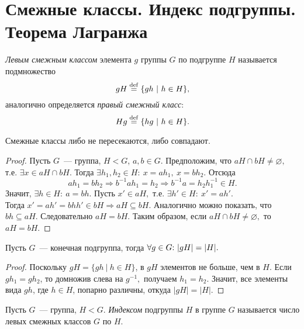 \newpage
	\section{Смежные классы. Индекс подгруппы. Теорема Лагранжа}
	\setcounter{definition}{0}
	\begin{definition}
		\textit{Левым смежным классом} элемента $g$ группы $G$ по подгруппе $H$ называется подмножество
		\begin{equation*}
			gH \deq \{gh \ | \ h \in H\},
		\end{equation*}
		аналогично определяется \textit{правый смежный класс}:
		\begin{equation*}
			Hg \stackrel{\mathrm{def}}{=} \{hg \ | \ h \in H\}.
		\end{equation*}
	\end{definition}
        \begin{lemma}
            Смежные классы либо не пересекаются, либо совпадают.
        \end{lemma}
        \begin{proof}
        Пусть $G$~--- группа, ${H < G}$, ${a,b \in G.}$ Предположим, что ${aH \cap bH \neq \varnothing,}$ т.е. ${\exists x \in aH \cap bH.}$ Тогда ${\exists h_1, h_2 \in H{:} \ x = ah_1, \ x = bh_2.}$  Отсюда 
        \begin{equation*}
            ah_1 = bh_2 \Rightarrow b^{-1}ah_1 = h_2 \Rightarrow b^{-1}a = h_2h_1^{-1} \in H.
        \end{equation*}
        Значит, ${\exists h \in H{:} \ a = bh.}$ Пусть ${x' \in aH,}$ т.е. ${\exists h' \in H{:} \ x' = ah'.}$ \\
        Тогда ${x' = ah' = bhh' \in bH \Rightarrow aH \subseteq bH.}$ Аналогично можно показать, что ${bh \subseteq aH.}$ Следовательно ${aH = bH.}$ Таким образом, если ${aH \cap bH \neq \varnothing,}$ то ${aH = bH.}$
        \end{proof}
	\begin{lemma}
		Пусть $G$~--- конечная подгруппа, тогда $\forall g \in G{:}{ } \  |gH| = |H|.$
	\end{lemma}
	\begin{proof}
		Поскольку ${gH = \{gh \ | \ h \in H\}}$, в $gH$ элементов не больше, чем в $H$. Если ${gh_1 = gh_2}$, то домножив слева на $g^{-1},$ получаем ${h_1 = h_2}$. Значит, все элементы вида $gh$, где ${h \in H}$, попарно различны, откуда ${|gH| = |H|}$.
	\end{proof}
	\begin{definition}
		Пусть $G$~--- группа, $H < G$. \textit{Индексом} подгруппы $H$ в группе $G$ называется число левых смежных классов $G$ по $H$.
	\end{definition} \n

